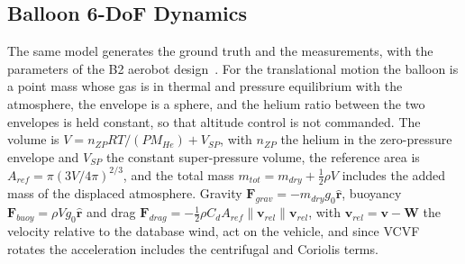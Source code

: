 \documentclass[preprint,12pt,a4paper]{elsarticle}
\begin{document}
\subsection{Balloon 6-DoF Dynamics}

The same model generates the ground truth and the measurements, with the parameters of the B2
aerobot design~\cite{Hall2021}.
For the translational motion the balloon is a point mass whose gas is in thermal and pressure
equilibrium with the atmosphere, the envelope is a sphere, and the helium ratio between the
two envelopes is held constant, so that altitude control is not commanded.
The volume is $V=n_{ZP}RT/(P M_{He})+V_{SP}$, with $n_{ZP}$ the helium in the zero-pressure
envelope and $V_{SP}$ the constant super-pressure volume, the reference area is
$A_{ref}=\pi(3V/4\pi)^{2/3}$, and the total mass $m_{tot}=m_{dry}+\frac12\rho V$ includes the
added mass of the displaced atmosphere.
Gravity $\mathbf{F}_{grav}=-m_{dry}g_0\hat{\mathbf{r}}$, buoyancy
$\mathbf{F}_{buoy}=\rho Vg_0\hat{\mathbf{r}}$ and drag
$\mathbf{F}_{drag}=-\frac12\rho C_dA_{ref}\|\mathbf{v}_{rel}\|\mathbf{v}_{rel}$, with
$\mathbf{v}_{rel}=\mathbf{v}-\mathbf{W}$ the velocity relative to the database wind, act on
the vehicle, and since VCVF rotates the acceleration includes the centrifugal and Coriolis
terms.
\end{document}

